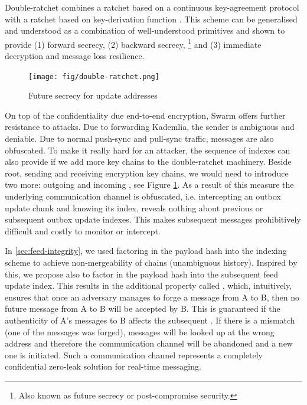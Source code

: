 Double-ratchet combines a ratchet based on a continuous key-agreement protocol with a ratchet based on key-derivation function \cite{perrin2016double}. This scheme can be generalised \cite{alwen2019double} and understood as a combination of well-understood primitives and shown to provide  (1) forward secrecy, (2) backward secrecy,%
%
\footnote{Also known as future secrecy or post-compromise security.}
%
and (3) immediate decryption and message loss resilience.


\begin{figure}[htbp]
\centering
\texttt{[image: fig/double-ratchet.png]}
\caption[Future secrecy for update addresses \statusorange]{Future secrecy for update addresses}
\label{fig:double-ratchet-for-feeds}
\end{figure}

On top of the confidentiality due end-to-end encryption, Swarm offers further resistance to attacks. Due to forwarding Kademlia, the sender is ambiguous and deniable. Due to normal push-sync and pull-sync traffic, messages are also obfuscated. To make it really hard for an attacker, the sequence of indexes can also provide  if we add more key chains to the double-ratchet machinery. Beside root, sending and receiving encryption key chains, we would need to introduce two more: outgoing and incoming , see Figure \ref{fig:double-ratchet-for-feeds}. As a result of this measure the underlying communication channel is obfuscated, i.e. intercepting an outbox update chunk and knowing its index, reveals nothing about previous or subsequent outbox update indexes. This makes subsequent messages prohibitively difficult and costly to monitor or intercept.

In \ref{sec:feed-integrity}, we used factoring in the payload hash into the indexing scheme to achieve non-mergeability of chains (unambiguous history). Inspired by this, we propose also to factor in the payload hash into the subsequent feed update index. This results in the additional property called ,  which, intuitively, ensures that once an adversary manages to forge a message from A to B, then no future message from A to B will be accepted by B.
This is guaranteed if the authenticity of A's  messages to B affects the subsequent . If there is a mismatch (one of the messages was forged), messages will be looked up at the wrong address and therefore the communication channel will be abandoned and a new one is initiated. Such a communication channel represents a completely confidential zero-leak solution for real-time messaging.





